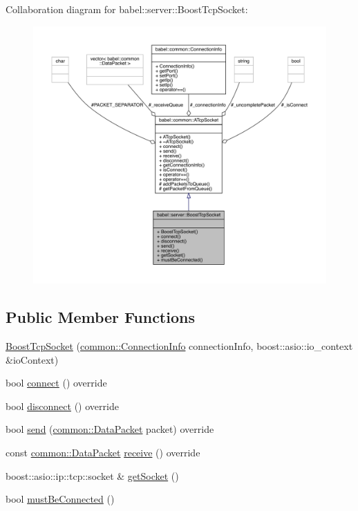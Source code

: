 Collaboration diagram for babel\+:\+:server\+:\+:Boost\+Tcp\+Socket\+:\nopagebreak
\begin{figure}[H]
\begin{center}
\leavevmode
\includegraphics[width=350pt]{classbabel_1_1server_1_1_boost_tcp_socket__coll__graph}
\end{center}
\end{figure}
\subsection*{Public Member Functions}
\begin{DoxyCompactItemize}
\item 
\mbox{\hyperlink{classbabel_1_1server_1_1_boost_tcp_socket_a2f3dff111d960e94b72d00f7da25cb05}{Boost\+Tcp\+Socket}} (\mbox{\hyperlink{classbabel_1_1common_1_1_connection_info}{common\+::\+Connection\+Info}} connection\+Info, boost\+::asio\+::io\+\_\+context \&io\+Context)
\item 
bool \mbox{\hyperlink{classbabel_1_1server_1_1_boost_tcp_socket_aaf7b9b56a3587d8b48c5ed9418492e12}{connect}} () override
\item 
bool \mbox{\hyperlink{classbabel_1_1server_1_1_boost_tcp_socket_ab5f0e6ea149aa5c1b54189b2214bac88}{disconnect}} () override
\item 
bool \mbox{\hyperlink{classbabel_1_1server_1_1_boost_tcp_socket_a037e9440c226c8701b55b005d9f1eea4}{send}} (\mbox{\hyperlink{classbabel_1_1common_1_1_data_packet}{common\+::\+Data\+Packet}} packet) override
\item 
const \mbox{\hyperlink{classbabel_1_1common_1_1_data_packet}{common\+::\+Data\+Packet}} \mbox{\hyperlink{classbabel_1_1server_1_1_boost_tcp_socket_a0f59c22aa0755aece70891287352bf5c}{receive}} () override
\item 
boost\+::asio\+::ip\+::tcp\+::socket \& \mbox{\hyperlink{classbabel_1_1server_1_1_boost_tcp_socket_ab02065f9b93488e1ff4aa141ff73ddc1}{get\+Socket}} ()
\item 
bool \mbox{\hyperlink{classbabel_1_1server_1_1_boost_tcp_socket_aa36010743728795b7b48909f7d22c432}{must\+Be\+Connected}} ()
\end{DoxyCompactItemize}
